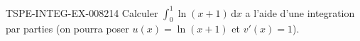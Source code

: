 \begin{exercice}{TSPE-INTEG-EX-008}{2}{14}
Calculer $\displaystyle\int_0^1 \ln(x+1)\,\mathrm{d}x$ a l'aide d'une integration par parties (on pourra poser $u(x)=\ln(x+1)$ et $v'(x)=1$).
\end{exercice}
